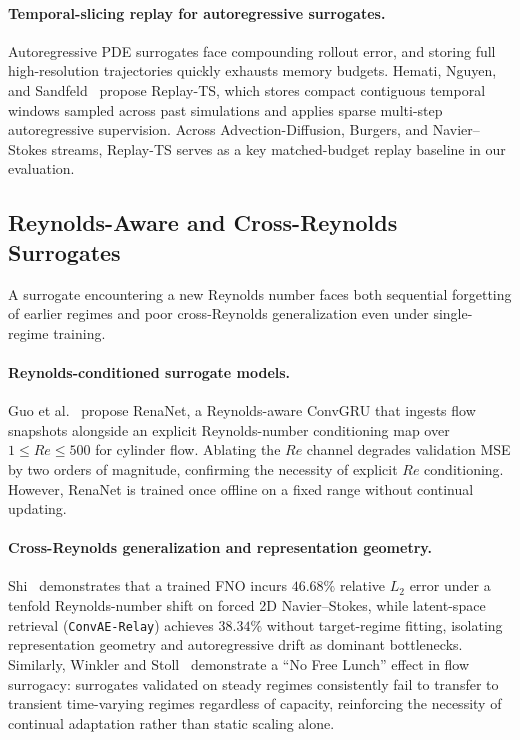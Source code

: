 \documentclass[11pt,a4paper]{article}
\begin{document}
\paragraph{Temporal-slicing replay for autoregressive surrogates.} Autoregressive PDE surrogates face compounding rollout error, and storing full high-resolution trajectories quickly exhausts memory budgets. Hemati, Nguyen, and Sandfeld~\cite{hemati2026replayts} propose Replay-TS, which stores compact contiguous temporal windows sampled across past simulations and applies sparse multi-step autoregressive supervision. Across Advection-Diffusion, Burgers, and Navier--Stokes streams, Replay-TS serves as a key matched-budget replay baseline in our evaluation.

\subsection{Reynolds-Aware and Cross-Reynolds Surrogates}

A surrogate encountering a new Reynolds number faces both sequential forgetting of earlier regimes and poor cross-Reynolds generalization even under single-regime training.

\paragraph{Reynolds-conditioned surrogate models.} Guo et al.~\cite{guo2026renanet} propose RenaNet, a Reynolds-aware ConvGRU that ingests flow snapshots alongside an explicit Reynolds-number conditioning map over $1 \le Re \le 500$ for cylinder flow. Ablating the $Re$ channel degrades validation MSE by two orders of magnitude, confirming the necessity of explicit $Re$ conditioning. However, RenaNet is trained once offline on a fixed range without continual updating.

\paragraph{Cross-Reynolds generalization and representation geometry.} Shi~\cite{shi2026striding} demonstrates that a trained FNO incurs $46.68\%$ relative $L_2$ error under a tenfold Reynolds-number shift on forced 2D Navier--Stokes, while latent-space retrieval (\texttt{ConvAE-Relay}) achieves $38.34\%$ without target-regime fitting, isolating representation geometry and autoregressive drift as dominant bottlenecks. Similarly, Winkler and Stoll~\cite{winkler2026nfl} demonstrate a ``No Free Lunch'' effect in flow surrogacy: surrogates validated on steady regimes consistently fail to transfer to transient time-varying regimes regardless of capacity, reinforcing the necessity of continual adaptation rather than static scaling alone.
\end{document}
